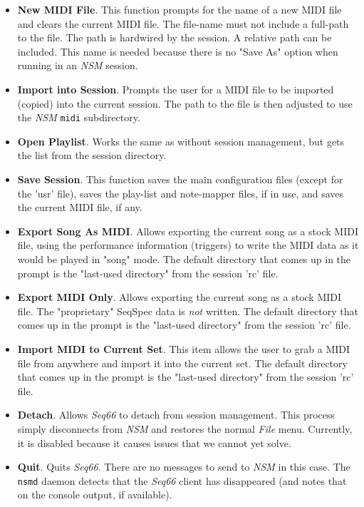    \begin{itemize}
      \item \textbf{New MIDI File}.
         This function prompts for the name of a
         new MIDI file and clears the current MIDI file.  The file-name must not
         include a full-path to the file.  The path is hardwired by the
         session.  A relative path can be included.  This name is needed
         because there is no "Save As" option when running in an \textsl{NSM}
         session.
      \item \textbf{Import into Session}.
         Prompts the user for a MIDI file to
         be imported (copied) into the current session.  The path to the file
         is then adjusted to use the \textsl{NSM} \texttt{midi} subdirectory.
      \item \textbf{Open Playlist}.
         Works the same as without session
         management, but gets the list from the session directory.
      \item \textbf{Save Session}.
         This function saves the main configuration
         files (except for the 'usr' file), saves the play-list and note-mapper
         files, if in use, and saves the current MIDI file, if any.
      \item \textbf{Export Song As MIDI}.
         Allows exporting the current song as a stock MIDI file, using the
         performance information (triggers) to write the MIDI data as it would
         be played in "song" mode.
         The default directory that comes up in the
         prompt is the "last-used directory" from the session 'rc' file.
      \item \textbf{Export MIDI Only}.
         Allows exporting the current song as a stock MIDI file.
         The "proprietary" SeqSpec data is \textsl{not} written.
         The default directory that comes up in the
         prompt is the "last-used directory" from the session 'rc' file.
      \item \textbf{Import MIDI to Current Set}.
         This item allows the user to grab a MIDI file from anywhere and import
         it into the current set.
         The default directory that comes up in the
         prompt is the "last-used directory" from the session 'rc' file.
      \item \textbf{Detach}.
         Allows \textsl{Seq66} to detach from session management.
         This process simply disconnects from \textsl{NSM} and restores the
         normal \textsl{File} menu.
         Currently, it is disabled because it causes issues that we cannot yet
         solve.
      \item \textbf{Quit}.
         Quits \textsl{Seq66}.
         There are no messages to send to \textsl{NSM} in this case.
         The \texttt{nsmd} daemon detects that the \textsl{Seq66} client has
         disappeared (and notes that on the console output, if available).
   \end{itemize}

